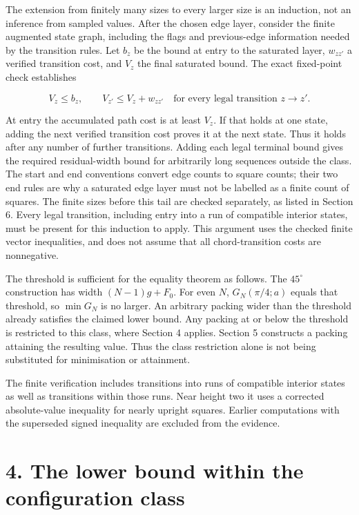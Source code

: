\documentclass[
  11pt,
  a4paper,
]{article}
\begin{document}
The extension from finitely many sizes to every larger size is an
induction, not an inference from sampled values. After the chosen edge
layer, consider the finite augmented state graph, including the flags
and previous-edge information needed by the transition rules. Let
\(b_z\) be the bound at entry to the saturated layer, \(w_{zz'}\) a
verified transition cost, and \(V_z\) the final saturated bound. The
exact fixed-point check establishes

\[
V_z\le b_z,\qquad V_{z'}\le V_z+w_{zz'}
\quad\text{for every legal transition }z\to z'.
\]

At entry the accumulated path cost is at least \(V_z\). If that holds at
one state, adding the next verified transition cost proves it at the
next state. Thus it holds after any number of further transitions.
Adding each legal terminal bound gives the required residual-width bound
for arbitrarily long sequences outside the class. The start and end
conventions convert edge counts to square counts; their two end rules
are why a saturated edge layer must not be labelled as a finite count of
squares. The finite sizes before this tail are checked separately, as
listed in Section 6. Every legal transition, including entry into a run
of compatible interior states, must be present for this induction to
apply. This argument uses the checked finite vector inequalities, and
does not assume that all chord-transition costs are nonnegative.

The threshold is sufficient for the equality theorem as follows. The
\(45^\circ\) construction has width \((N-1)g+F_0\). For even \(N\),
\(G_N(\pi/4;a)\) equals that threshold, so \(\min G_N\) is no larger. An
arbitrary packing wider than the threshold already satisfies the claimed
lower bound. Any packing at or below the threshold is restricted to this
class, where Section 4 applies. Section 5 constructs a packing attaining
the resulting value. Thus the class restriction alone is not being
substituted for minimisation or attainment.

The finite verification includes transitions into runs of compatible
interior states as well as transitions within those runs. Near height
two it uses a corrected absolute-value inequality for nearly upright
squares. Earlier computations with the superseded signed inequality are
excluded from the evidence.

\section{4. The lower bound within the configuration
class}\label{the-lower-bound-within-the-configuration-class}
\end{document}

